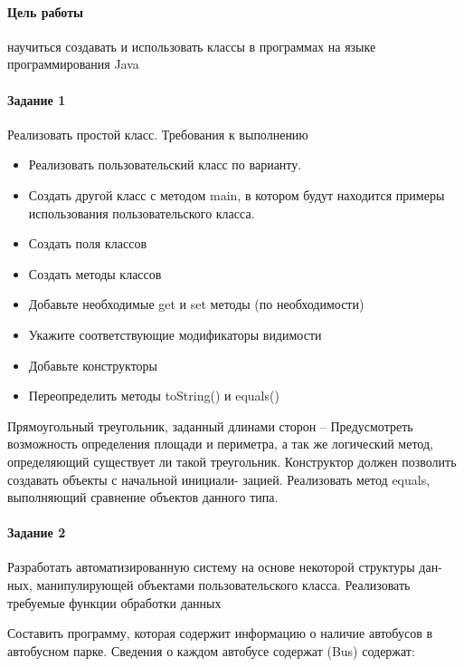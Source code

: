 \paragraph{Цель работы}
научиться создавать и использовать классы в программах на языке программирования Java

\paragraph{Задание 1}
Реализовать простой класс.
Требования к выполнению
\begin{itemize}
    \item Реализовать пользовательский класс по варианту.
    \item Создать другой класс с методом main, в котором будут находится примеры использования пользовательского класса.
\end{itemize}
\begin{itemize}
    \item Создать поля классов
    \item Создать методы классов
    \item Добавьте необходимые get и set методы (по необходимости)
    \item Укажите соответствующие модификаторы видимости
    \item Добавьте конструкторы
    \item Переопределить методы toString() и equals()
\end{itemize}
Прямоугольный треугольник, заданный длинами сторон – Предусмотреть возможность
определения площади и периметра, а так же логический метод, определяющий существует ли
такой треугольник. Конструктор должен позволить создавать объекты с начальной инициали-
зацией. Реализовать метод equals, выполняющий сравнение объектов данного типа.




\paragraph{Задание 2}
Разработать автоматизированную систему на основе некоторой структуры дан- ных,
манипулирующей объектами пользовательского класса. Реализовать требуемые функции обработки данных

Составить программу, которая содержит информацию о наличие автобусов в автобусном парке.
Сведения о каждом автобусе содержат (Bus) содержат:

